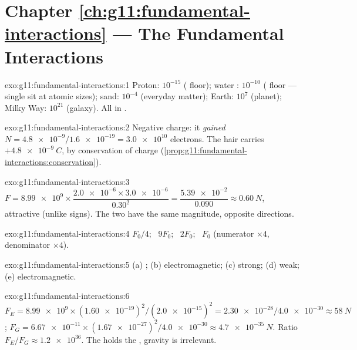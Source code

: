 \section*{Chapter \ref{ch:g11:fundamental-interactions} --- The Fundamental Interactions}

\begin{solution}{exo:g11:fundamental-interactions:1}
Proton: $10^{-15}$ ( floor); water : $10^{-10}$
( floor --- single  sit at atomic sizes); sand:
$10^{-4}$ (everyday matter); Earth: $10^{7}$ (planet); Milky Way:
$10^{21}$ (galaxy). All in .
\end{solution}

\begin{solution}{exo:g11:fundamental-interactions:2}
Negative charge: it \emph{gained}
$N = \num{4.8e-9}/\num{1.6e-19} = \num{3.0e10}$ electrons. The hair
carries $+\qty{4.8e-9}{C}$, by conservation of charge
(\cref{prop:g11:fundamental-interactions:conservation}).
\end{solution}

\begin{solution}{exo:g11:fundamental-interactions:3}
$F = \num{8.99e9} \times \dfrac{\num{2.0e-6} \times \num{3.0e-6}}{0.30^2}
= \dfrac{\num{5.39e-2}}{0.090} \approx \qty{0.60}{N}$, attractive
(unlike signs). The two  have the same magnitude, opposite
directions.
\end{solution}

\begin{solution}{exo:g11:fundamental-interactions:4}
$F_0/4$; \ $9F_0$; \ $2F_0$; \ $F_0$ (numerator $\times 4$, denominator
$\times 4$).
\end{solution}

\begin{solution}{exo:g11:fundamental-interactions:5}
(a) ; (b) electromagnetic; (c) strong; (d) weak;
(e) electromagnetic.
\end{solution}

\begin{solution}{exo:g11:fundamental-interactions:6}
$F_E = \num{8.99e9} \times (\num{1.60e-19})^2/(\num{2.0e-15})^2
= \num{2.30e-28}/\num{4.0e-30} \approx \qty{58}{N}$;
$F_G = \num{6.67e-11} \times (\num{1.67e-27})^2/\num{4.0e-30}
\approx \qty{4.7e-35}{N}$. Ratio $F_E/F_G \approx \num{1.2e36}$. The
 holds the , gravity is irrelevant.
\end{solution}

